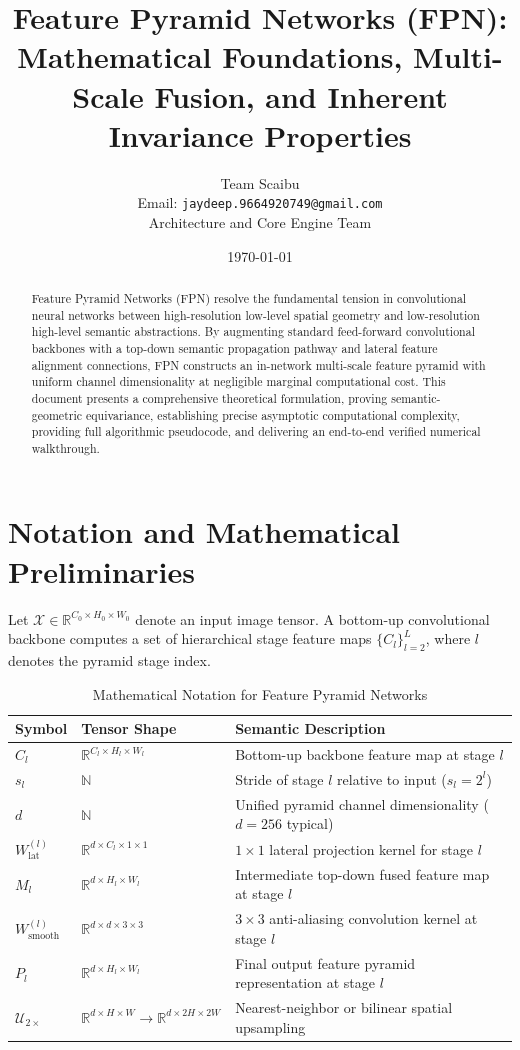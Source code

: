 \documentclass[11pt,a4paper]{article}
\title{Feature Pyramid Networks (FPN): Mathematical Foundations, Multi-Scale Fusion, and Inherent Invariance Properties}
\author{Team Scaibu \\ \small Email: \texttt{jaydeep.9664920749@gmail.com} \\ \small Architecture and Core Engine Team}
\date{\today}
\theoremstyle{definition}
\begin{document}
\maketitle

\begin{abstract}
Feature Pyramid Networks (FPN) resolve the fundamental tension in convolutional neural networks between high-resolution low-level spatial geometry and low-resolution high-level semantic abstractions. By augmenting standard feed-forward convolutional backbones with a top-down semantic propagation pathway and lateral feature alignment connections, FPN constructs an in-network multi-scale feature pyramid with uniform channel dimensionality at negligible marginal computational cost. This document presents a comprehensive theoretical formulation, proving semantic-geometric equivariance, establishing precise asymptotic computational complexity, providing full algorithmic pseudocode, and delivering an end-to-end verified numerical walkthrough.
\end{abstract}

\section{Notation and Mathematical Preliminaries}

Let $\mathcal{X} \in \mathbb{R}^{C_0 \times H_0 \times W_0}$ denote an input image tensor. A bottom-up convolutional backbone computes a set of hierarchical stage feature maps $\{C_l\}_{l=2}^L$, where $l$ denotes the pyramid stage index.

\begin{table}[h]
\centering
\caption{Mathematical Notation for Feature Pyramid Networks}
\begin{tabular}{lll}
\toprule
\textbf{Symbol} & \textbf{Tensor Shape} & \textbf{Semantic Description} \\
\midrule
$C_l$ & $\mathbb{R}^{C_l \times H_l \times W_l}$ & Bottom-up backbone feature map at stage $l$ \\
$s_l$ & $\mathbb{N}$ & Stride of stage $l$ relative to input ($s_l = 2^l$) \\
$d$ & $\mathbb{N}$ & Unified pyramid channel dimensionality ($d = 256$ typical) \\
$W_{\text{lat}}^{(l)}$ & $\mathbb{R}^{d \times C_l \times 1 \times 1}$ & $1 \times 1$ lateral projection kernel for stage $l$ \\
$M_l$ & $\mathbb{R}^{d \times H_l \times W_l}$ & Intermediate top-down fused feature map at stage $l$ \\
$W_{\text{smooth}}^{(l)}$ & $\mathbb{R}^{d \times d \times 3 \times 3}$ & $3 \times 3$ anti-aliasing convolution kernel at stage $l$ \\
$P_l$ & $\mathbb{R}^{d \times H_l \times W_l}$ & Final output feature pyramid representation at stage $l$ \\
$\mathcal{U}_{2\times}$ & $\mathbb{R}^{d \times H \times W} \to \mathbb{R}^{d \times 2H \times 2W}$ & Nearest-neighbor or bilinear spatial upsampling \\
\bottomrule
\end{tabular}
\end{table}
\end{document}
